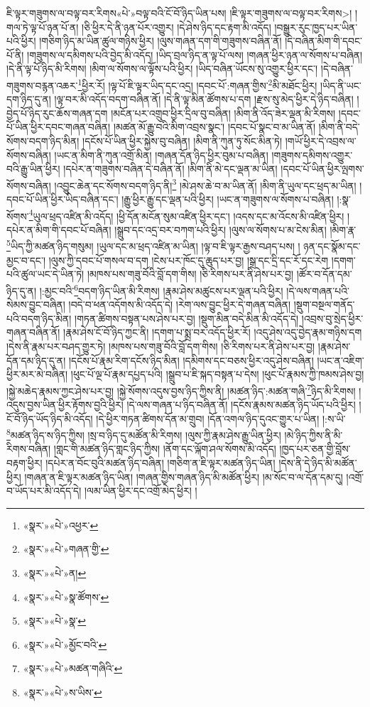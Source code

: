 ཇི་ལྟར་གཟུགས་ལ་བལྟ་བར་རིགས«པེ་»བལྟ་བའི་ངོ་བོ་ཉིད་ཡིན་པས། །ཇི་ལྟར་གཟུགས་ལ་བལྟ་བར་རིགས>། །གལ་ཏེ་ལྟ་པོ་ཉན་པོ་ན། །ཅི་ཕྱིར་དེ་ནི་ཉན་པོར་འགྱུར། །དེ་ཤེས་ཉིད་དང་རྟག་མི་འདོད། །བསྒྱུར་རུང་ཁྱད་པར་ཡིན་པའི་ཕྱིར། །གཅིག་ཉིད་མ་ཡིན་ཚུལ་གཉིས་ཕྱིར། །ལུས་གཞན་དག་གི་གཟུགས་བཞིན་ནོ། །དེ་བཞིན་མིག་གི་དབང་པོ་ནི། །གཟུགས་ལ་དམིགས་པའི་བྱེད་མི་འདོད། །ཡིད་བྲལ་ཉིད་ན་ལྟ་པོ་ལས། །གཞན་ཕྱིར་ཉན་ལ་སོགས་པ་བཞིན། །དེ་ནི་ལྟ་པོ་ཉིད་མི་རིགས། །མིག་ལ་སོགས་ལ་ལྟོས་པའི་ཕྱིར། །ཡིད་བཞིན་ཡོངས་སུ་འགྱུར་ཕྱིར་དང་། །དེ་བཞིན་གཟུགས་བརྙན་འཆར་\footnote{«སྣར་»«པེ་»འཕྱར་}ཕྱིར་རོ། །ལྟ་པོ་ཇི་ལྟར་ཡིད་དང་འདྲ། །དབང་པོ་:གཞན་གྱིས་\footnote{«སྣར་»«པེ་»གཞན་གྱི་}མི་མཐོང་ཕྱིར། །ཡིད་ནི་ཡང་དག་ཉིད་དུ་ན། །ལྟ་བར་མི་འདོད་བདག་བཞིན་ནོ། །དེ་ནི་ལྟ་མིན་ཚོགས་པ་དག །རྫས་སུ་མེད་ཕྱིར་དེ་ཉིད་བཞིན། །བྱེད་པོ་ཉིད་རུང་ཆོས་གཞན་དག །མངོན་པར་འགྲུབ་ཕྱིར་དྲིལ་བུ་བཞིན། །མིག་ནི་འོད་ཟེར་ལྡན་མི་རིགས། །དབང་པོ་ཡིན་ཕྱིར་དབང་གཞན་བཞིན། །མཚན་མོ་རྒྱུ་བའི་མིག་འབྲས་སྣང་། །དབང་པོ་སྣང་བ་མ་ཡིན་ནོ། །མིག་ནི་བདེ་སོགས་བདག་ཉིད་མིན། །དངོས་པོ་ཡིན་ཕྱིར་སྐྱེས་བུ་བཞིན། །མིག་ནི་ཀུན་ཏུ་སོང་མིན་ཏེ། །གཡོ་ཕྱིར་དེ་འབྲས་ལ་སོགས་བཞིན། །ཡང་ན་མིག་ནི་ཀུན་འགྲོ་མིན། །གཞན་དོན་ཉིད་ཕྱིར་བུམ་པ་བཞིན། །གཟུགས་དམིགས་འགྱུར་བའི་རྒྱུ་ཡིན་ཕྱིར། །དཔེར་ན་གཟུགས་བཞིན་དེ་བཞིན་ནོ། །མིག་ནི་མེ་དང་ལྡན་མ་ཡིན། །དབང་པོ་ཡིན་ཕྱིར་ལྤགས་སོགས་བཞིན། །འབྱུང་ཆེན་དང་སོགས་བདག་ཉིད་ནི།\footnote{«སྣར་»«པེ་»ན།} །མེ་ཤས་ཆེ་བ་མ་ཡིན་ནོ། །མིག་ནི་ཡུལ་དང་ཕྲད་མ་ཡིན། །དབང་པོ་ཡིན་ཕྱིར་ཡིད་བཞིན་དང་། །རྒྱུ་ཕྱིར་རྒྱུ་དང་ལྡན་པའི་ཕྱིར། །ཡང་ན་གཟུགས་ལ་སོགས་པ་བཞིན། །:སྣ་སོགས་\footnote{«སྣར་»«པེ་»སྣ་ཚོགས་}ཡུལ་ཕྲད་འཛིན་མི་འདོད། །ཕྱི་དོན་མངོན་སུམ་འཛིན་ཕྱིར་དང་། །འདས་དང་མ་འོངས་མི་འཛིན་ཕྱིར། །དཔེར་ན་མིག་གི་དབང་པོ་བཞིན། །སྒྲུབ་དང་འདྲ་བར་བཀག་པའི་ཕྱིར། །ལུས་ལ་སོགས་པ་མ་ངེས་མིན། །མིག་རྣ་\footnote{«སྣར་»«པེ་»སྣ་}ཡིད་ཀྱི་མཚན་ཉིད་གསུམ། །ཡུལ་དང་མ་ཕྲད་འཛིན་མ་ཡིན། །ལྟ་བ་ཇི་ལྟར་རྒྱས་བཤད་པས། །
ཉན་དང་སྣོམ་དང་མྱང་བ་དང་། །ལུས་ཀྱི་དབང་པོ་གསལ་བ་དག །ངེས་པར་ཁོང་དུ་ཆུད་པར་བྱ། །སྒྲ་དང་དྲི་དང་རོ་དང་རེག །དགག་པའི་ཚུལ་ཡང་དེ་ཡིན་ཏེ། །མཁས་པས་གཟུ་བོའི་བློ་དག་གིས། །ཅི་རིགས་པར་ནི་ཤེས་པར་བྱ། །ཚོར་བ་དོན་དམ་ཉིད་དུ་ན། །:མྱང་བའི་\footnote{«སྣར་»«པེ་»མྱོང་བའི་}བདག་ཉིད་ཡིན་མི་རིགས། །རྣམ་ཤེས་མཚུངས་པར་ལྡན་པའི་ཕྱིར། །དེ་ལས་གཞན་པའི་སེམས་བྱུང་བཞིན། །བདེ་བ་ཕན་འདོགས་མི་འདོད་དེ། །རེག་ལས་བྱུང་ཕྱིར་དེ་གཞན་བཞིན། །སྡུག་བསྔལ་གནོད་པའི་བདག་ཉིད་མིན། །གཏན་ཚིགས་བསྟན་པས་ཤེས་པར་བྱ། །སྡུག་མིན་བདེ་མིན་མི་འདོད་དེ། །འབྲས་བུ་སྲེད་ཕྱིར་གཞན་བཞིན་ནོ། །རྣམ་ཤེས་ངོ་བོ་ཉིད་ཀྱང་ནི། །དགག་པ་སྨྲ་བར་འདོད་ཕྱིར་རོ། །འདུ་ཤེས་འདུ་བྱེད་རྣམ་གཉིས་དག །དེས་ནི་རྣམ་པར་བཤད་གྱུར་ཏེ། །མཁས་པས་གཟུ་བོའི་བློ་དག་གིས། །ཅི་རིགས་པར་ནི་ཤེས་པར་བྱ། །རྣམ་ཤེས་དོན་དམ་ཉིད་དུ་ན། །དངོས་པོ་རྣམ་རིག་དངོས་ཉིད་མིན། །དམིགས་དང་བཅས་ཕྱིར་འདུ་ཤེས་བཞིན། །ཡང་ན་འཇིག་ཕྱིར་མར་མེ་བཞིན། །ཕུང་པོ་ལྔ་པོ་རྣམ་དཔྱད་པའི། །སྒྲུབ་པ་ཇི་སྐད་བསྟན་པ་དེས། །ཕུང་པོ་རྣམས་ཀྱི་ཁམས་ཤེས་བྱ། །སྐྱེ་མཆེད་རྣམས་ཀྱང་ཤེས་པར་བྱ། །སྐྱེ་སོགས་འདུས་བྱས་ཉིད་ཀྱིས་ནི། །མཚན་ཉིད་:མཚན་གཞི་\footnote{«སྣར་»«པེ་»མཚན་གཞིའི་}ཉིད་མི་རིགས། །འདུས་བྱས་ཡིན་ཕྱིར་རྟོགས་བྱའི་ཕྱིར། །དེ་ལས་གཞན་པ་ཉིད་བཞིན་ནོ། །དངོས་རྣམས་མཚན་ཉིད་ཡོད་པའི་ཕྱིར། །ངོ་བོ་ཉིད་ཡོད་ཉིད་མི་འདོད། །དེ་ཕྱིར་གཏན་ཚིགས་དོན་མ་གྲུབ། །དོན་འགལ་ཉིད་དུའང་གྱུར་པ་ཡིན། །:ས་ཡི་\footnote{«སྣར་»«པེ་»ས་ཡིས་}མཚན་ཉིད་ས་ཉིད་ཀྱིས། །སྲ་བ་ཉིད་དུ་མཚོན་མི་རིགས། །ལུས་ཀྱི་རྣམ་ཤེས་རྒྱུ་ཡིན་ཕྱིར། །མེ་ཉིད་ཀྱིས་ནི་མི་རིགས་བཞིན། །གླང་གི་མཚན་ཉིད་གླང་ཉིད་ཀྱིས། །ནོག་དང་ལྐོག་ཤལ་སོགས་མི་འདོད། །ཁྱད་པར་ཅན་གྱི་བློས་བརྟག་ཕྱིར། །དཔེར་ན་བོང་བུའི་མཚན་ཉིད་བཞིན། །གཅིག་ན་ཇི་ལྟར་མཚན་ཉིད་ཡིན། །དེས་ནི་དེ་ཉིད་མི་མཚོན་ཕྱིར། །གཞན་ན་ཇི་ལྟར་མཚན་ཉིད་ཡིན། །གཞན་གྱིས་གཞན་ཉིད་མི་མཚོན་ཕྱིར། །མ་སོང་བ་ལ་དོན་དམ་དུ། །འགྲོ་བ་ཡོད་པར་མི་འདོད་དེ། །ལམ་ཡིན་ཕྱིར་དང་འགྲོ་མེད་ཕྱིར། །
